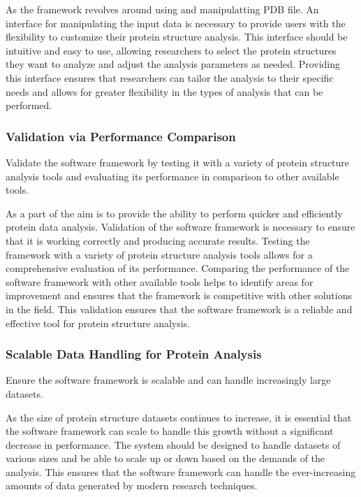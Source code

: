 \documentclass[]{final_report}
\begin{document}
As the framework revolves around using and manipulatting PDB file. An interface for manipulating the input data is necessary to provide users with the flexibility to customize their protein structure analysis. This interface should be intuitive and easy to use, allowing researchers to select the protein structures they want to analyze and adjust the analysis parameters as needed. Providing this interface ensures that researchers can tailor the analysis to their specific needs and allows for greater flexibility in the types of analysis that can be performed.

\subsubsection{Validation via Performance Comparison}

\begin{displayquote}
    Validate the software framework by testing it with a variety of protein structure analysis tools and evaluating its performance in comparison to other available tools.
\end{displayquote}

As a part of the aim is to provide the ability to perform quicker and efficiently protein data analysis. Validation of the software framework is necessary to ensure that it is working correctly and producing accurate results. Testing the framework with a variety of protein structure analysis tools allows for a comprehensive evaluation of its performance. Comparing the performance of the software framework with other available tools helps to identify areas for improvement and ensures that the framework is competitive with other solutions in the field. This validation ensures that the software framework is a reliable and effective tool for protein structure analysis.

\subsubsection{Scalable Data Handling for Protein Analysis}

\begin{displayquote}
    Ensure the software framework is scalable and can handle increasingly large datasets.
\end{displayquote}

As the size of protein structure datasets continues to increase, it is essential that the software framework can scale to handle this growth without a significant decrease in performance. The system should be designed to handle datasets of various sizes and be able to scale up or down based on the demands of the analysis. This ensures that the software framework can handle the ever-increasing amounts of data generated by modern research techniques.
\clearpage
\end{document}
